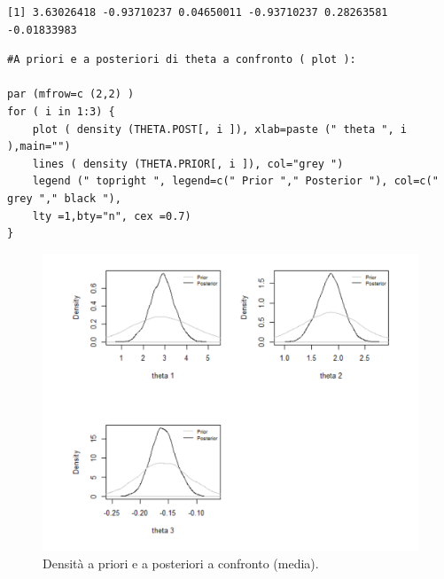 {
\color{red}
\begin{Verbatim}
[1] 3.63026418 -0.93710237 0.04650011 -0.93710237 0.28263581 -0.01833983
\end{Verbatim}
}

\begin{lstlisting}[style=R]
#A priori e a posteriori di theta a confronto ( plot ):

par (mfrow=c (2,2) )
for ( i in 1:3) {
    plot ( density (THETA.POST[, i ]), xlab=paste (" theta ", i ),main="")
    lines ( density (THETA.PRIOR[, i ]), col="grey ")
    legend (" topright ", legend=c(" Prior "," Posterior "), col=c(" grey "," black "),
    lty =1,bty="n", cex =0.7)
}
\end{lstlisting}

\begin{figure}
    \centering
    \includegraphics[totalheight=8.5cm]{img/esercizio11-2-3.png}
    \caption{  Densità a priori e a posteriori a confronto (media).}
\end{figure}

